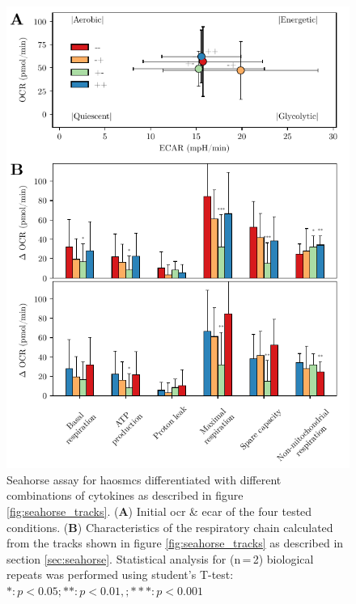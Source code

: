     \begin{figure}[h!]
    \capstart
        \centering
    	\includegraphics{Abbildung/Seahorse_summary_merged.pdf}

    	\begin{minipage}{\captionwidth}
    		\caption[energy_profile]{ \newline Seahorse assay for \acp{haosmc} differentiated with different combinations of cytokines as described in figure \ref{fig:seahorse_tracks}.
            (\textbf{A}) Initial \ac{ocr} \& \ac{ecar} of the four tested conditions. (\textbf{B}) Characteristics of the respiratory chain calculated from the tracks shown in figure \ref{fig:seahorse_tracks} as described in section \ref{sec:seahorse}. Statistical analysis for (n\,=\,2) biological repeats was performed using student's T-test: $*: p < 0.05; **: p < 0.01, ; ***: p < 0.001$}
    		\label{fig:energy_profile}
    	\end{minipage}
    \end{figure}

